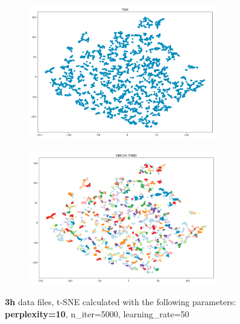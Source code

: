 \begin{figure}[H]
  \centering
	\begin{subfigure}{.5\textwidth}
    \centering
    \includegraphics[width=0.9\textwidth]{./images/tsneParametersTest/perplexity/perp10-3hTSNE.png}
  \end{subfigure}%
  \begin{subfigure}{.5\textwidth}
    \centering
    \includegraphics[width=0.9\textwidth]{./images/tsneParametersTest/perplexity/perp10-3hDBSCAN.png}
	\end{subfigure}
	\caption{\textbf{3h} data files, t-SNE calculated with the following parameters: \textbf{perplexity=10}, n\_iter=5000, learning\_rate=50}
  \label{figure:3hperp10TSNE}
\end{figure}

